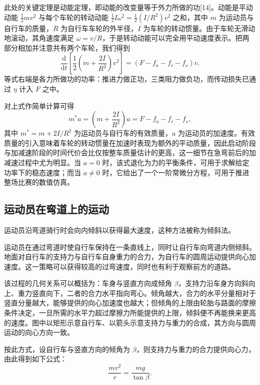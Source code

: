 \documentclass[11pt,a4paper]{ctexart}
\begin{document}
此处的关键定理是动能定理，即动能的改变量等于外力所做的功[14]。动能是平动动能 $\frac{1}{2}mv^{2}$ 与每个车轮的转动动能 $\frac{1}{2}I\omega^{2}=\frac{1}{2}\left(I/R^{2}\right)v^{2}$ 之和，其中 $m$ 为运动员与自行车的质量，$R$ 为自行车车轮的外半径，$I$ 为车轮的转动惯量。由于车轮无滑动地滚动，其角速度满足 $\omega=v/R$，于是转动动能可以完全用平动速度表示。把两部分相加并注意共有两个车轮，我们得到
\begin{equation}
\frac{\mathrm{d}}{\mathrm{d}t}\left[\frac{1}{2}\left(m+\frac{2I}{R^{2}}\right)v^{2}\right]=\left(F-f_a-f_r-f_s\right)v.
\end{equation}
等式右端是各力所做功的功率：推进力做正功，三类阻力做负功，而传动损失已通过 $\eta$ 计入 $F$ 之中。

对上式作简单计算可得
\begin{equation}
m^{*}a=\left(m+\frac{2I}{R^{2}}\right)a=F-f_a-f_r-f_s,
\end{equation}
其中 $m^{*}=m+2I/R^{2}$ 为运动员与自行车的有效质量，$a$ 为运动员的加速度。有效质量的引入意味着车轮的转动惯量在加速时表现为额外的平动质量，因此启动阶段与加减速阶段的时间代价会比仅按整车质量估计的更高，这一细节在急弯前后的加减速过程中尤为明显。当 $a=0$ 时，该式退化为力的平衡条件，可用于求解给定功率下的稳态速度；而当 $a\neq0$ 时，它给出了一个一阶常微分方程，可用于推进整场比赛的数值仿真。

\subsection{运动员在弯道上的运动}

运动员沿弯道骑行时会向内倾斜以获得最大速度，这种方法被称为倾斜法。

运动员在通过弯道时使自行车保持在一条直线上，同时让自行车向弯道内侧倾斜。地面对自行车的支持力与自行车自身重力的合力，为自行车的圆周运动提供向心加速度。这一策略可以获得较高的过弯速度，同时也有利于观察前方的道路。

该过程的几何关系可以概括为：车身与竖直方向成倾角 $\beta$，支持力沿车身方向斜向上、重力竖直向下，二者的合力水平指向弯心。倾角越大，合力的水平分量相对于竖直分量越大，能够提供的向心加速度也越大；但倾角的上限由轮胎与路面的摩擦条件决定，一旦所需的水平力超过摩擦力所能提供的上限，倾斜便不再能换来更高的速度。图中以矩形示意自行车、以箭头示意支持力与重力的合成，其方向与圆周运动的向心方向一致。

按此方式，设自行车与竖直方向的倾角为 $\beta$，则支持力与重力的合力提供向心力，由此得到如下公式：
\begin{equation}
\frac{mv^{2}}{r}=\frac{mg}{\tan\beta}.
\end{equation}
\end{document}
